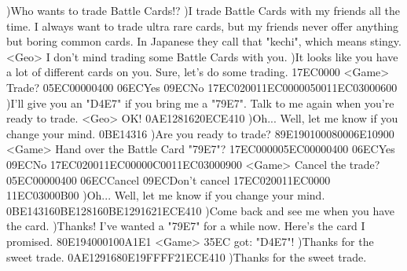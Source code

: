 )Who wants to trade Battle Cards!? 
)I trade Battle Cards with my friends all the time. 
I always want to trade ultra rare cards, but my friends 
never offer anything but boring common cards. 
In Japanese they call that "kechi", which means stingy. 
<Geo> I don't mind trading some Battle Cards with you. 
)It looks like you have a lot of different cards on you. 
Sure, let's do some trading. 
{17}{EC}{00}{00} 
<Game> Trade? {05}{EC}{00}{00}{04}{00}  {06}{EC}Yes   {09}{EC}No 
{17}{EC}{02}{00}{11}{EC}{00}{00}{05}{00}{11}{EC}{03}{00}{06}{00}
)I'll give you an "{D4}{E7}" if you bring me a "{79}{E7}". 
Talk to me again when you're ready to trade. 
<Geo> OK! 
{0A}{E1}{28}{16}{20}{EC}{E4}{10}
)Oh... Well, let me know if you change your mind. 
{0B}{E1}{43}{16}
)Are you ready to trade? 
{89}{E1}9{01}{00}{08}{00}{06}{E1}{09}{00}
<Game> Hand over the Battle Card "{79}{E7}"? 
{17}{EC}{00}{00}{05}{EC}{00}{00}{04}{00}  {06}{EC}Yes   {09}{EC}No 
{17}{EC}{02}{00}{11}{EC}{00}{00}{0C}{00}{11}{EC}{03}{00}{09}{00}
<Game> Cancel the trade? {05}{EC}{00}{00}{04}{00}  {06}{EC}Cancel   {09}{EC}Don't cancel 
{17}{EC}{02}{00}{11}{EC}{00}{00} {11}{EC}{03}{00}{0B}{00}
)Oh... Well, let me know if you change your mind. 
{0B}{E1}{43}{16}{0B}{E1}{28}{16}{0B}{E1}{29}{16}{21}{EC}{E4}{10}
)Come back and see me when you have the card. 
)Thanks! I've wanted a "{79}{E7}" for a while now. 
Here's the card I promised. 
{80}{E1}{94}{00}{01}{00}{A1}{E1} 
<Game> {35}{EC} got: "{D4}{E7}"! 
)Thanks for the sweet trade. 
{0A}{E1}{29}{16}{80}{E1}9{FF}{FF}{21}{EC}{E4}{10}
)Thanks for the sweet trade. 
